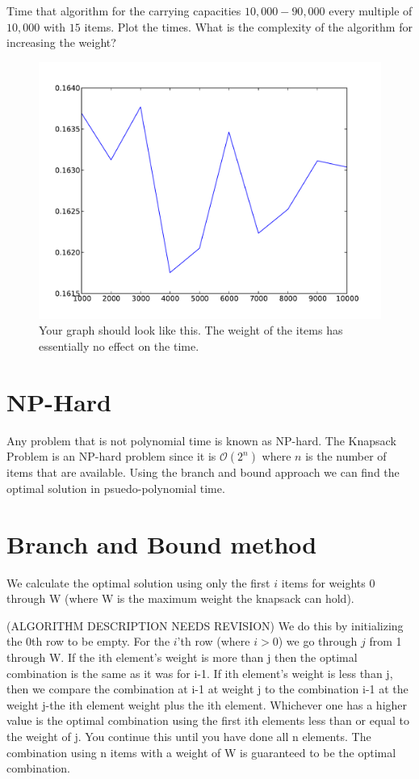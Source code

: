 \begin{problem}
Time that algorithm for the carrying capacities $10,000-90,000$ every multiple of $10,000$ with $15$ items.
Plot the times.
What is the complexity of the algorithm for increasing the weight?

\begin{figure}[H]
\includegraphics[width=\textwidth]{naiveWeight.pdf}
\caption{
Your graph should look like this.
The weight of the items has essentially no effect on the time.}
\end{figure}
\end{problem}

\section*{NP-Hard}

Any problem that is not polynomial time is known as NP-hard.
The Knapsack Problem is an NP-hard problem since it is $\mathcal{O}\left(2^n\right)$ where $n$ is the number of items that are available.
Using the branch and bound approach we can find the optimal solution in psuedo-polynomial time.

\section*{Branch and Bound method}

We calculate the optimal solution using only the first $i$ items for weights 0 through W (where W is the maximum weight the knapsack can hold).

(ALGORITHM DESCRIPTION NEEDS REVISION)
We do this by initializing the 0th row to be empty.
For the $i$'th row (where $i>0$) we go through $j$ from 1 through W.
If the ith element's weight is more than j then the optimal combination is the same as it was for i-1.
If ith element's weight is less than j, then we compare the combination at i-1 at weight j to the combination i-1 at the weight j-the ith element weight plus the ith element.
Whichever one has a higher value is the optimal combination using the first ith elements less than or equal to the weight of j.
You continue this until you have done all n elements.
The combination using n items with a weight of W is guaranteed to be the optimal combination.


